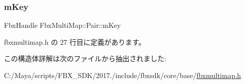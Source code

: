 \subsubsection{\texorpdfstring{m\+Key}{mKey}}
{\footnotesize\ttfamily Fbx\+Handle Fbx\+Multi\+Map\+::\+Pair\+::m\+Key}



 fbxmultimap.\+h の 27 行目に定義があります。



この構造体詳解は次のファイルから抽出されました\+:\begin{DoxyCompactItemize}
\item 
C\+:/\+Maya/scripts/\+F\+B\+X\+\_\+\+S\+D\+K/2017./include/fbxsdk/core/base/\hyperlink{fbxmultimap_8h}{fbxmultimap.\+h}\end{DoxyCompactItemize}
